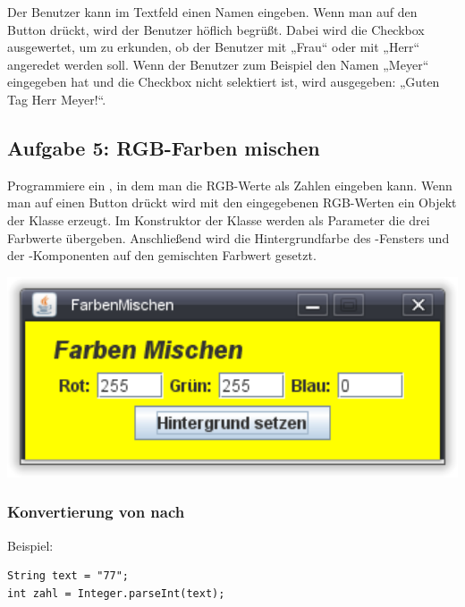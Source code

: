 Der Benutzer kann im Textfeld einen Namen eingeben. Wenn man auf den Button
drückt, wird der Benutzer höflich begrüßt. Dabei wird die Checkbox ausgewertet,
um zu erkunden, ob der Benutzer mit „Frau“ oder mit „Herr“ angeredet werden
soll. Wenn der Benutzer zum Beispiel den Namen „Meyer“ eingegeben hat und die
Checkbox nicht selektiert ist, wird ausgegeben: „Guten Tag Herr Meyer!“.


\subsection{Aufgabe 5: RGB-Farben mischen}

Programmiere ein , in dem man die RGB-Werte als Zahlen eingeben
kann. Wenn man auf einen Button drückt wird mit den eingegebenen RGB-Werten ein
Objekt der Klasse  erzeugt. Im Konstruktor der Klasse
 werden als Parameter die drei Farbwerte übergeben. Anschließend
wird die Hintergrundfarbe des -Fensters und der
-Komponenten auf den gemischten Farbwert gesetzt.

\begin{minipage}{0.5\textwidth}
\includegraphics[width=1.0\textwidth]{./inf/SEKII/24_Java_GUI-Komponenten/FarbenMischen.png}
\end{minipage}
\hfill
\begin{minipage}{0.4\textwidth}
\subsubsection{Konvertierung von  nach }

Beispiel:

\begin{lstlisting}
String text = "77";
int zahl = Integer.parseInt(text);
\end{lstlisting}
\end{minipage}